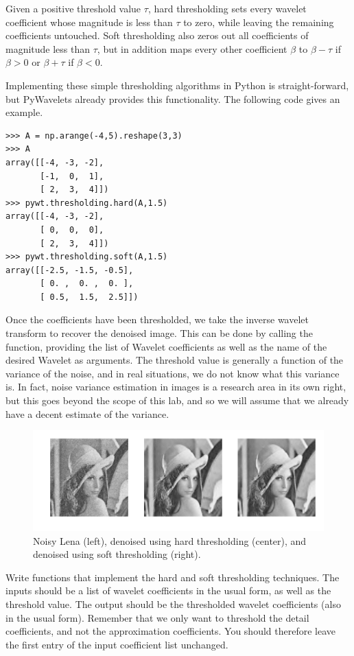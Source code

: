 Given a positive threshold value $\tau$, hard thresholding sets
every wavelet coefficient whose magnitude is less than $\tau$ to
zero, while leaving the remaining coefficients untouched. Soft
thresholding also zeros out all coefficients of magnitude less than
$\tau$, but in addition maps every other coefficient $\beta$ to
$\beta - \tau$ if $\beta > 0$ or $\beta + \tau$ if $\beta < 0$.

Implementing these simple thresholding algorithms in Python is 
straight-forward, but PyWavelets already provides this functionality.
The following code gives an example.

\begin{lstlisting}
>>> A = np.arange(-4,5).reshape(3,3)
>>> A
array([[-4, -3, -2],
       [-1,  0,  1],
       [ 2,  3,  4]])
>>> pywt.thresholding.hard(A,1.5)
array([[-4, -3, -2],
       [ 0,  0,  0],
       [ 2,  3,  4]])
>>> pywt.thresholding.soft(A,1.5)
array([[-2.5, -1.5, -0.5],
       [ 0. ,  0. ,  0. ],
       [ 0.5,  1.5,  2.5]])
\end{lstlisting}

Once the coefficients have been thresholded, we take the inverse
wavelet transform to recover the denoised image. This can be done
by calling the  function, providing the list of Wavelet
coefficients as well as the name of the desired Wavelet as arguments.
The threshold value is generally a function of the variance of the noise,
and in real situations, we do not know what this variance is. In fact,
noise variance estimation in images is a research area in its own
right, but this goes beyond the scope of this lab, and so we will
assume that we already have a decent estimate of the variance.

\begin{figure}[t]
    \includegraphics[width=\linewidth]{denoise.pdf}
    \caption{Noisy Lena (left), denoised using hard thresholding (center), 
    and denoised using soft thresholding (right).}
    \label{fig:denoise}
\end{figure}

\begin{problem}
Write functions that implement the hard and soft thresholding
techniques. The inputs should be a list of wavelet coefficients
in the usual form, as well as the threshold value. The output
should be the thresholded wavelet coefficients (also in
the usual form). Remember that we only want to threshold the
detail coefficients, and not the approximation coefficients.
You should therefore leave the first entry of the input
coefficient list unchanged.
\end{problem}

